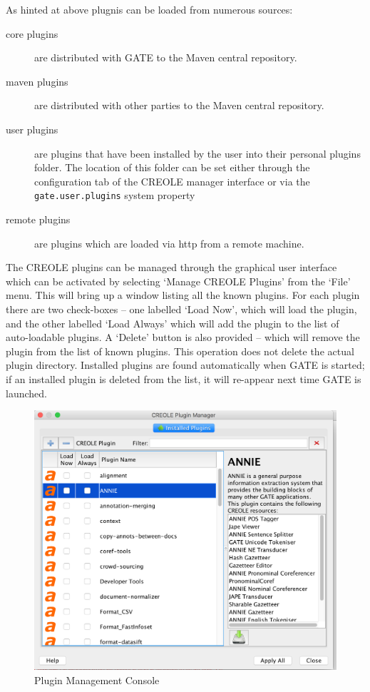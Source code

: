 As hinted at above plugnis can be loaded from numerous sources:
\begin{description}
\item[core plugins] are distributed with GATE to the Maven central repository.
\item[maven plugins] are distributed with other parties to the Maven central repository.
\item[user plugins] are plugins that have been installed by the user into their
personal plugins folder. The location of this folder can be set either through the
configuration tab of the CREOLE manager interface or via the {\tt gate.user.plugins}
system property
\item[remote plugins] are plugins which are loaded via http from a remote machine.
\end{description}

The CREOLE plugins can be managed through the graphical user interface which can
be activated by selecting `Manage CREOLE Plugins' from the `File' menu. This
will bring up a window listing all the known plugins. For each plugin there are
two check-boxes -- one labelled `Load Now', which will load the plugin, and the
other labelled `Load Always' which will add the plugin to the list of
auto-loadable plugins. A `Delete' button is also provided -- which will remove
the plugin from the list of known plugins. This operation does not delete the 
actual plugin directory. Installed plugins are found automatically when GATE is
started; if an installed plugin is deleted from the list, it will re-appear next 
time GATE is launched.

\begin{figure}[htb]
\begin{center}
\includegraphics[width=14cm]{creole-manager85.png}
\end{center}
\caption{Plugin Management Console}
\label{fig:plugin-manager}
\end{figure}

